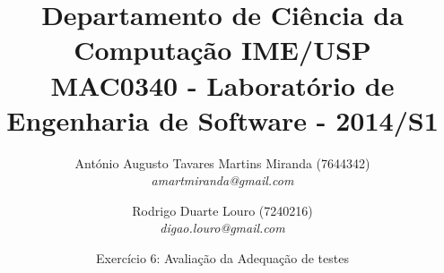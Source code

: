 \documentclass[a4paper,11pt]{article}
\begin{document}
\small{
\title{
{\small 
Departamento de Ciência da Computação \hfill IME/USP}\\\vspace{0.1in}
MAC0340 - Laboratório de Engenharia de Software - 2014/S1
}
\vspace{-0.6in}

\author{
	António Augusto Tavares Martins Miranda (7644342) \\
	\textit{amartmiranda@gmail.com}
	\and
	Rodrigo Duarte Louro (7240216)\\
	\textit{digao.louro@gmail.com}
	\vspace{0.1in}
	\and
}

\date{Exercício 6: Avaliação da Adequação de testes}
\maketitle
}
\vspace {-0.4in}
\thispagestyle{empty}
\end{document}
